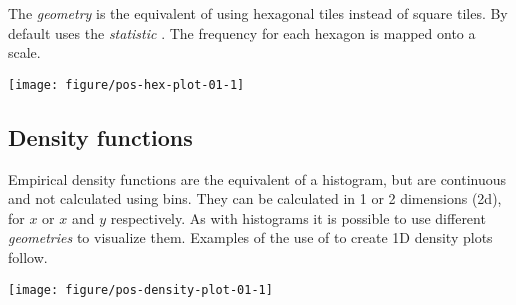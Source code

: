 \documentclass[krantz2]{krantz}\usepackage{knitr}%
\begin{document}
The \emph{geometry}  is the equivalent of  using hexagonal tiles instead of square tiles. By default uses the \emph{statistic} . The frequency for each hexagon is mapped onto a  scale.

\begin{knitrout}\footnotesize
{}\color{fgcolor}\begin{kframe}
\begin{alltt}
  \hlopt{+}
  \hlstd{(} \hlstd{=} \hlstd{)}
\end{alltt}
\end{kframe}

{\centering \texttt{[image: figure/pos-hex-plot-01-1]} 

}



\end{knitrout}

\subsection{Density functions}\label{sec:plot:density}
Empirical density functions are the equivalent of a histogram, but are continuous and not calculated using bins. They can be calculated in 1 or 2 dimensions (2d), for $x$ or $x$ and $y$ respectively. As with histograms it is possible to use different \emph{geometries} to visualize them. Examples of the use of  to create 1D density plots follow.

\begin{knitrout}\footnotesize
{}\color{fgcolor}\begin{kframe}
\begin{alltt}
    \hlopt{+}
  \hlstd{()}
\end{alltt}
\end{kframe}

{\centering \texttt{[image: figure/pos-density-plot-01-1]} 

}



\end{knitrout}
\end{document}
